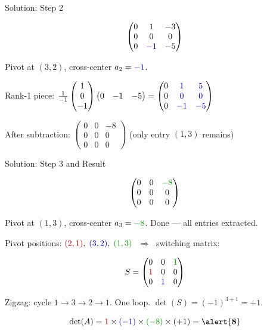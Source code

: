 \documentclass[10pt]{beamer}
\theoremstyle{definition}
\newcommand{\x}[1]{\alert{\textbf{#1}}}
\newcommand{\rd}[1]{{\color{red!70!black}#1}}
\newcommand{\bl}[1]{{\color{blue!70!black}#1}}
\newcommand{\gn}[1]{{\color{green!60!black}#1}}
\begin{document}
\begin{frame}{Solution: Step 2}

$$
\begin{pmatrix} 0 & 1 & -3 \\ 0 & 0 & 0 \\ 0 & \bl{-1} & -5 \end{pmatrix}
$$

Pivot at $(3,2)$, cross-center $a_2 = \bl{-1}$.

\vfill

Rank-1 piece: $\frac{1}{-1}\begin{pmatrix}1\\0\\-1\end{pmatrix}\begin{pmatrix}0&-1&-5\end{pmatrix} = \begin{pmatrix}0&\bl{1}&\bl{5}\\0&\bl{0}&\bl{0}\\0&\bl{-1}&\bl{-5}\end{pmatrix}$

\vfill

After subtraction: $\begin{pmatrix}0&0&-8\\0&0&0\\0&0&0\end{pmatrix}$ \quad (only entry $(1,3)$ remains)

\end{frame}


\begin{frame}{Solution: Step 3 and Result}

$$
\begin{pmatrix} 0 & 0 & \gn{-8} \\ 0 & 0 & 0 \\ 0 & 0 & 0 \end{pmatrix}
$$

Pivot at $(1,3)$, cross-center $a_3 = \gn{-8}$. Done --- all entries extracted.

\vfill

Pivot positions: $\rd{(2,1)},\; \bl{(3,2)},\; \gn{(1,3)}$ $\;\Rightarrow\;$ switching matrix:

$$
S = \begin{pmatrix} 0 & 0 & \gn{1} \\ \rd{1} & 0 & 0 \\ 0 & \bl{1} & 0 \end{pmatrix}
$$

\vfill

Zigzag: cycle $1 \to 3 \to 2 \to 1$. One loop. $\det(S) = (-1)^{3+1} = +1$.

\vfill

$$
\det(A) = \rd{1} \times \bl{(-1)} \times \gn{(-8)} \times (+1) = \x{8}
$$

\end{frame}
\end{document}
